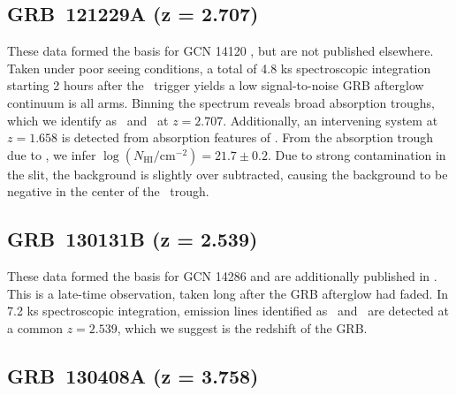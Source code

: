\documentclass[longauth]{aa}    %
\begin{document}
%

\subsection{GRB~121229A (z = 2.707)} \label{121229}

These data formed the basis for GCN 14120 \citep{GCN14120}, but are not
published elsewhere. Taken under poor seeing conditions, a total of 4.8 ks
spectroscopic integration starting 2 hours after the \swift~trigger yields a low
signal-to-noise GRB afterglow continuum is all arms. Binning the spectrum
reveals broad absorption troughs, which we identify as \lyb~and \lya~at $z =
2.707$. Additionally, an intervening system at $z = 1.658$ is detected from
absorption features of \mgii. From the absorption trough due to \lya, we infer
$\log (N_{\mathrm{HI}}/\mathrm{cm}^{-2}) = 21.7 \pm 0.2$. Due to strong
contamination in the slit, the background is slightly over subtracted, causing
the background to be negative in the center of the \lya~trough.

\subsection{GRB~130131B (z = 2.539)} \label{130131}

These data formed the basis for GCN 14286 \citep{GCN14286} and are additionally
published in \citet{Kruhler2015}. This is a late-time observation, taken long
after the GRB afterglow had faded. In 7.2 ks spectroscopic integration, emission
lines identified as \oii~and \oiii~are detected at a common $z = 2.539$, which
we suggest is the redshift of the GRB.

\subsection{GRB~130408A (z = 3.758)} \label{130408}
\end{document}
